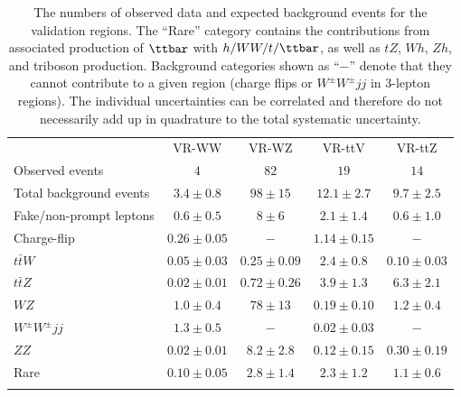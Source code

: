 \begin{table}
\caption{The numbers of observed data and expected background events for the validation regions. 
The ``Rare'' category contains the contributions from associated production of $\ttbar$ with $h/WW/t/\ttbar$, 
as well as $tZ$, $Wh$, $Zh$, and triboson production. 
Background categories shown as ``$-$'' denote that they cannot contribute to a given region (charge flips or $W^\pm W^\pm jj$ in 3-lepton regions). 
The individual uncertainties can be correlated and therefore do not necessarily add up in quadrature to the total systematic uncertainty. }
\label{tab:VR_yields}
\begin{center}
\setlength{\tabcolsep}{0.0pc}
{\small
\begin{tabular*}{\textwidth}{@{\extracolsep{\fill}}lcccc}
\noalign{\smallskip}\hline\hline\noalign{\smallskip}
          & VR-WW       & VR-WZ     & VR-ttV  & VR-ttZ     \\[-0.05cm]
\noalign{\smallskip}\hline\hline\noalign{\smallskip}
Observed events          & $4$       &  $82$   & $19$  & $14$ \\
\noalign{\smallskip}\hline\noalign{\smallskip}
Total background events & $3.4 \pm 0.8$ & $98 \pm 15$ & $12.1 \pm 2.7$\hspace*{1.75mm} & $9.7 \pm 2.5$\\
\noalign{\smallskip}\hline\noalign{\smallskip}
Fake/non-prompt leptons & $0.6 \pm 0.5$ & $8 \pm 6$ & $2.1 \pm 1.4$ & $0.6\pm 1.0$\\ 
Charge-flip & $0.26 \pm 0.05$ & $-$ & $1.14 \pm 0.15$ & $-$\\
$t\bar{t}W$ & $0.05 \pm 0.03$ & $0.25 \pm 0.09$ & $2.4 \pm 0.8$ & $0.10 \pm 0.03$\\
$t\bar{t}Z$ & $0.02 \pm 0.01$ & $0.72 \pm 0.26$ & $3.9 \pm 1.3$ & $6.3 \pm 2.1$\\
$WZ$ & $1.0 \pm 0.4$ & $78 \pm 13$ & $0.19 \pm 0.10$ & $1.2 \pm 0.4$\\
$W^\pm W^\pm jj$ & $1.3 \pm 0.5$ & $-$ & $0.02 \pm 0.03$ & $-$\\
$ZZ$ & $0.02 \pm 0.01$ & $8.2 \pm 2.8$ & $0.12 \pm 0.15$ & $0.30 \pm 0.19$\\
Rare & $0.10 \pm 0.05$ & $2.8 \pm 1.4$ & $2.3 \pm 1.2$ & $1.1 \pm 0.6$\\
\noalign{\smallskip}\hline\hline\noalign{\smallskip}
\end{tabular*}
}
\end{center}
\end{table}
		

